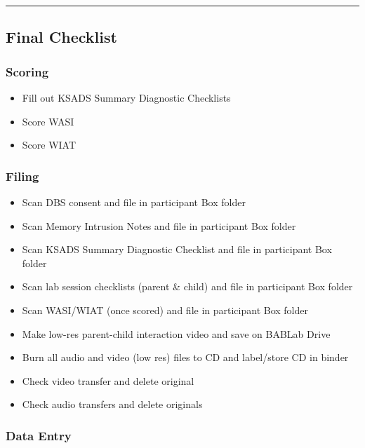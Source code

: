 \documentclass[]{book}
\providecommand{\tightlist}{%
  \setlength{\itemsep}{0pt}\setlength{\parskip}{0pt}}
\begin{document}
\begin{center}\rule{0.5\linewidth}{0.5pt}\end{center}

\hypertarget{final-checklist}{%
\subsection{Final Checklist}\label{final-checklist}}

\hypertarget{scoring}{%
\subsubsection{Scoring}\label{scoring}}

\begin{itemize}
\tightlist
\item
  Fill out KSADS Summary Diagnostic Checklists
\item
  Score WASI
\item
  Score WIAT
\end{itemize}

\hypertarget{filing-1}{%
\subsubsection{Filing}\label{filing-1}}

\begin{itemize}
\tightlist
\item
  Scan DBS consent and file in participant Box folder
\item
  Scan Memory Intrusion Notes and file in participant Box folder
\item
  Scan KSADS Summary Diagnostic Checklist and file in participant Box folder
\item
  Scan lab session checklists (parent \& child) and file in participant Box folder
\item
  Scan WASI/WIAT (once scored) and file in participant Box folder
\item
  Make low-res parent-child interaction video and save on BABLab Drive
\item
  Burn all audio and video (low res) files to CD and label/store CD in binder
\item
  Check video transfer and delete original
\item
  Check audio transfers and delete originals
\end{itemize}

\hypertarget{data-entry-1}{%
\subsubsection{Data Entry}\label{data-entry-1}}
\end{document}
